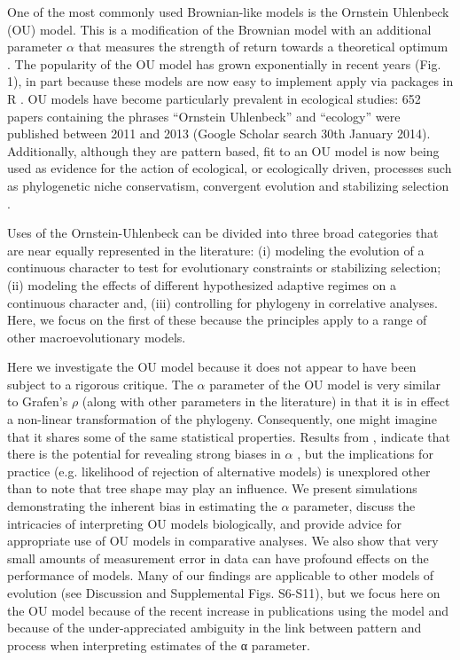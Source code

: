 \documentclass[a4paper,12pt]{article}
\begin{document}
One of the most commonly used Brownian-like models is the Ornstein Uhlenbeck (OU) model. This is a modification of the Brownian model with an additional parameter $\alpha$ that measures the strength of return towards a theoretical optimum \citep{hansen1997stabilizing}. The popularity of the OU model has grown exponentially in recent years (Fig. 1), in part because these models are now easy to implement apply via packages in R \citep[e.g. ouch, GEIGER and OUwie;][]{Butler:2004aa,Harmon:2008aa,beaulieu2012ouwie}. OU models have become particularly prevalent in ecological studies: 652 papers containing the phrases “Ornstein Uhlenbeck” and “ecology” were published between 2011 and 2013 (Google Scholar search 30th January 2014). Additionally, although they are pattern based, fit to an OU model is now being used as evidence for the action of ecological, or ecologically driven, processes such as phylogenetic niche conservatism, convergent evolution and stabilizing selection \citep[e.g.,][]{Wiens:2010aa,christin2013anatomical,ingram2013surface}.

Uses of the Ornstein-Uhlenbeck can be divided into three broad categories that are near equally represented in the literature: (i) modeling the evolution of a continuous character to test for evolutionary constraints or stabilizing selection; (ii) modeling the effects of different hypothesized adaptive regimes on a continuous character and, (iii) controlling for phylogeny in correlative analyses. Here, we focus on the first of these because the principles apply to a range of other macroevolutionary models.  

Here we investigate the OU model because it does not appear to have been subject to a rigorous critique. The $\alpha$ parameter of the OU model is very similar to Grafen’s $\rho$ (along with other parameters in the literature) in that it is in effect a non-linear transformation of the phylogeny. Consequently, one might imagine that it shares some of the same statistical properties. Results from \citet{ho2013asymptotic}, indicate that there is the potential for revealing strong biases in $\alpha$ , but the implications for practice (e.g. likelihood of rejection of alternative models) is unexplored other than to note that tree shape may play an influence. We present simulations demonstrating the inherent bias in estimating the $\alpha$ parameter, discuss the intricacies of interpreting OU models biologically, and provide advice for appropriate use of OU models in comparative analyses. We also show that very small amounts of measurement error in data can have profound effects on the performance of models. Many of our findings are applicable to other models of evolution (see Discussion and Supplemental Figs. S6-S11), but we focus here on the OU model because of the recent increase in publications using the model and because of the under-appreciated ambiguity in the link between pattern and process when interpreting estimates of the α parameter. 
\end{document}
